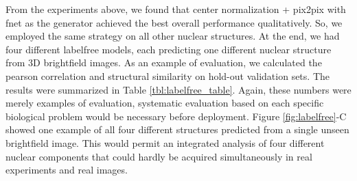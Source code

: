 From the experiments above, we found that center normalization + pix2pix with fnet as the generator achieved the best overall performance qualitatively. So, we employed the same strategy on all other nuclear structures. At the end, we had four different labelfree models, each predicting one different nuclear structure from 3D brightfield images. As an example of evaluation, we calculated the pearson correlation and structural similarity on hold-out validation sets. The results were summarized in Table \ref{tbl:labelfree_table}. Again, these numbers were merely examples of evaluation, systematic evaluation based on each specific biological problem would be necessary before deployment. Figure \ref{fig:labelfree}-C showed one example of all four different structures predicted from a single unseen brightfield image. This would permit an integrated analysis of four different nuclear components that could hardly be acquired simultaneously in real experiments and real images.

